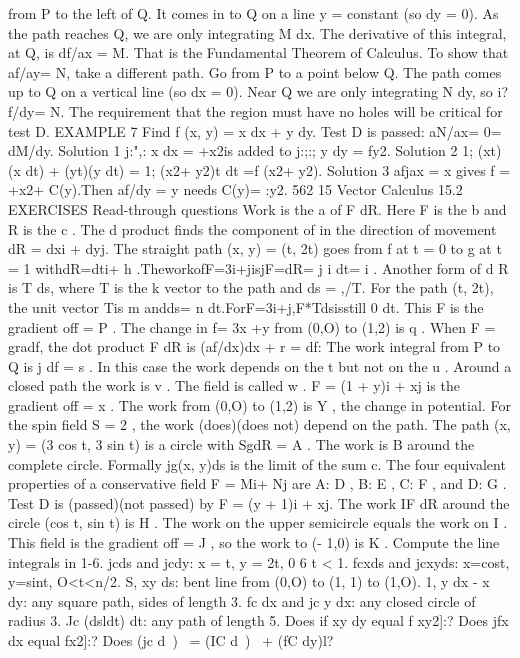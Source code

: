 from P to the left of Q. It comes in to Q on a line y = constant (so dy = 0). As the
path reaches Q, we are only integrating M dx. The derivative of this integral, at Q, is
df/ax = M. That is the Fundamental Theorem of Calculus.
To show that af/ay= N, take a different path. Go from P to a point below Q. The
path comes up to Q on a vertical line (so dx = 0). Near Q we are only integrating
N dy, so i?f/dy= N.
The requirement that the region must have no holes will be critical for test D.
EXAMPLE 7 Find f (x, y) = x dx + y dy. Test D is passed: aN/ax= 0= dM/dy.
Solution 1 j:",: x dx = +x2is added to j:;:; y dy = fy2.
Solution 2 1; (xt)(x dt) + (yt)(y dt) = 1; (x2+ y2)t dt =f (x2+ y2).
Solution 3 afjax = x gives f = +x2+ C(y).Then af/dy = y needs C(y)= :y2. 
562 15 Vector Calculus
15.2 EXERCISES
Read-through questions
Work is the a of F dR. Here F is the b and R is
the c . The d product finds the component of
in the direction of movement dR = dxi + dyj. The straight
path (x, y) = (t, 2t) goes from f at t = 0 to g at t =
1 withdR=dti+ h .TheworkofF=3i+jisjF=dR=
j i dt= i .
Another form of d R is T ds, where T is the k vector to
the path and ds = ,/T. For the path (t, 2t), the unit vector
Tis m andds= n dt.ForF=3i+j,F*Tdsisstill
0 dt. This F is the gradient off = P . The change in
f= 3x +y from (0,O) to (1,2) is q .
When F = gradf, the dot product F dR is (af/dx)dx + r = df: The work integral from P to Q is j df = s . In this case the work depends on the t but not on the
u . Around a closed path the work is v . The field is
called w . F = (1 + y)i + xj is the gradient off = x .
The work from (0,O) to (1,2) is Y , the change in potential.
For the spin field S = 2 , the work (does)(does not)
depend on the path. The path (x, y) = (3 cos t, 3 sin t) is a
circle with SgdR = A . The work is B around the
complete circle. Formally jg(x, y)ds is the limit of the sum
c.
The four equivalent properties of a conservative field F =
Mi+ Nj are A: D , B: E , C: F , and D: G . Test D is (passed)(not passed) by F = (y + 1)i + xj. The work
IF dR around the circle (cos t, sin t) is H . The work on
the upper semicircle equals the work on I . This field is
the gradient off = J , so the work to (- 1,0) is K .
Compute the line integrals in 1-6.
jcds and jcdy: x = t, y = 2t, 0 6 t < 1.
fcxds and jcxyds: x=cost, y=sint, O<t<n/2.
S, xy ds: bent line from (0,O) to (1, 1) to (1,O).
1, y dx - x dy: any square path, sides of length 3.
fc dx and jc y dx: any closed circle of radius 3.
Jc (dsldt) dt: any path of length 5.
Does if xy dy equal f xy2]:?
Does jfx dx equal fx2]:?
Does (jc d~)~ = (IC d~)~ + (fC dy)l?

